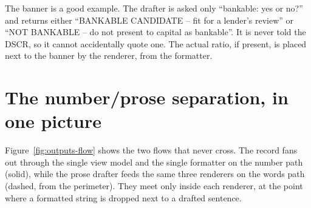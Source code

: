 \begin{plainnote}
The banner is a good example. The drafter is asked only ``bankable: yes or no?'' and returns either ``BANKABLE CANDIDATE -- fit for a lender's review'' or ``NOT BANKABLE -- do not present to capital as bankable''. It is never told the DSCR, so it cannot accidentally quote one. The actual ratio, if present, is placed next to the banner by the renderer, from the formatter.
\end{plainnote}

\section{The number/prose separation, in one picture}

Figure~\ref{fig:outputs-flow} shows the two flows that never cross. The record fans out through the single view model and the single formatter on the number path (solid), while the prose drafter feeds the same three renderers on the words path (dashed, from the perimeter). They meet only inside each renderer, at the point where a formatted string is dropped next to a drafted sentence.

